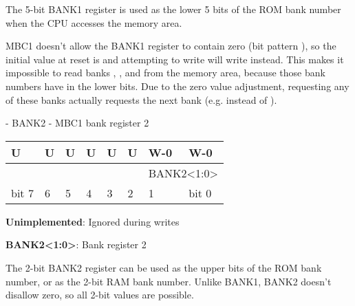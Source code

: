 \documentclass[\main/gbctr.tex]{subfiles}
\begin{document}
The 5-bit BANK1 register is used as the lower 5 bits of the ROM bank number
when the CPU accesses the  memory area.

MBC1 doesn't allow the BANK1 register to contain zero (bit pattern
), so the initial value at reset is  and attempting to
write  will write  instead. This makes it impossible to
read banks , ,  and  from the
 memory area, because those bank numbers have 
in the lower bits. Due to the zero value adjustment, requesting any of these
banks actually requests the next bank (e.g.   instead of ).

\begin{register}[H]
  \caption{ - BANK2 - MBC1 bank register 2}

  {
    \ttfamily
    \begin{tabularx}{\linewidth}{|X|X|X|X|X|X|X|X|}
      \hline
      U                     & U                     & U                     & U                     & U                     & U                     & W-0                                  & W-0   \\
      \hline
      \cellcolor{LightGray} & \cellcolor{LightGray} & \cellcolor{LightGray} & \cellcolor{LightGray} & \cellcolor{LightGray} & \cellcolor{LightGray} & \multicolumn{2}{c|}{BANK2<1:0>} \\
      \hline
      bit 7                 & 6                     & 5                     & 4                     & 3                     & 2                     & 1                                    & bit 0 \\
      \hline
    \end{tabularx}{\parfillskip=0pt\par}
  }

  \begin{description}[leftmargin=5em, style=nextline]
    \item[bit 7-2]
      \textbf{Unimplemented}: Ignored during writes
    \item[bit 1-0]
      \textbf{BANK2<1:0>}: Bank register 2
  \end{description}
\end{register}

The 2-bit BANK2 register can be used as the upper bits of the ROM bank number,
or as the 2-bit RAM bank number. Unlike BANK1, BANK2 doesn't disallow zero, so
all 2-bit values are possible.
\end{document}
